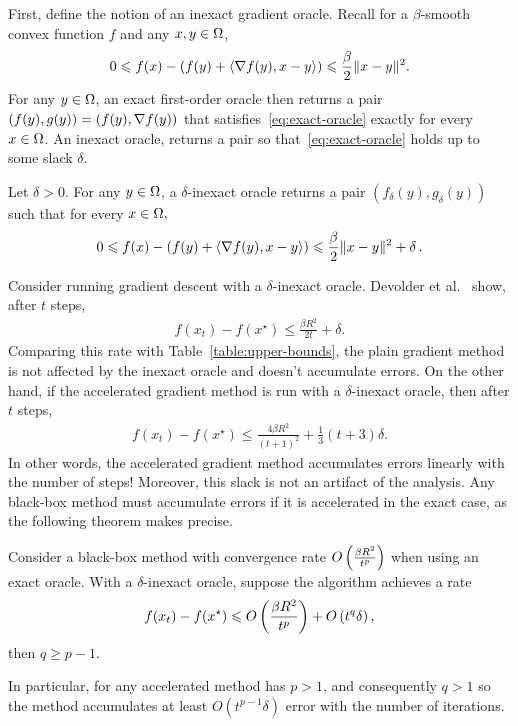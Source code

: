 First, define the notion of an inexact gradient oracle. Recall for a
$\beta$-smooth convex function $f$ and any $x, y \in \Omega$,
\begin{align}
    0 \leqslant f(x)  - \left(f(y) + \langle \nabla f(y), x - y \rangle \right )
    \leqslant \frac{\beta}{2} \lVert x-y\rVert^2. \label{eq:exact-oracle}
\end{align}
For any $y \in \Omega$, an exact first-order oracle then returns a pair
$(f(y), g(y)) = (f(y), \nabla f(y))$ that satisfies~\eqref{eq:exact-oracle}
exactly for every $x \in \Omega$. 
An inexact oracle, returns a pair so that~\eqref{eq:exact-oracle} holds up to some
slack $\delta$.
~
\begin{definition}
Let $\delta > 0$. For any $y\in \Omega$, a $\delta$-inexact oracle returns a pair
$(f_\delta(y), g_\delta(y))$ such that
for every $x \in \Omega,$
\begin{align*}
    0 \leqslant f(x)  - \left(f(y) + \langle \nabla f(y), x - y \rangle \right )
    \leqslant \frac{\beta}{2} \lVert x-y\rVert^2 + \delta\,.
\end{align*}
\end{definition}
Consider running gradient descent with a $\delta$-inexact oracle.
Devolder et al.~\cite{devolder2014first} show, after $t$ steps,
\begin{align*}
    f(x_t) - f(x^\star) \leq \frac{\beta R^2}{2t} + \delta.
\end{align*}
Comparing this rate with Table~\ref{table:upper-bounds}, the plain gradient
method is not affected by the inexact oracle and doesn't accumulate errors. 
On the other hand, if the accelerated gradient
method is run with a $\delta$-inexact oracle, then after $t$ steps,
\begin{align*}
    f(x_t) - f(x^\star)  \leq \frac{4 \beta R^2}{(t+1)^2} +
    \frac{1}{3}(t+3)\delta.
\end{align*}
In other words, the accelerated gradient method accumulates errors linearly with
the number of steps! Moreover, this slack is not an artifact of the analysis.
Any black-box method must accumulate errors if it is accelerated in the exact
case, as the following theorem makes precise.
\begin{theorem}
Consider a black-box method with convergence rate $O\left(\frac{\beta R^2}{t^p} \right )$
when using an exact oracle. With a $\delta$-inexact oracle, suppose the
algorithm achieves a rate
\begin{align}
    f(x_t) - f(x^\star) \leqslant O\left(\frac{\beta R^2}{t^p} \right ) + O\left(t^q \delta \right ),
\end{align}
then $q \geq p-1$.
\end{theorem}
In particular, for any accelerated method has $p > 1$, and consequently $q > 1$
so the method accumulates at least $O(t^{p-1} \delta)$ error with the number of
iterations. 
